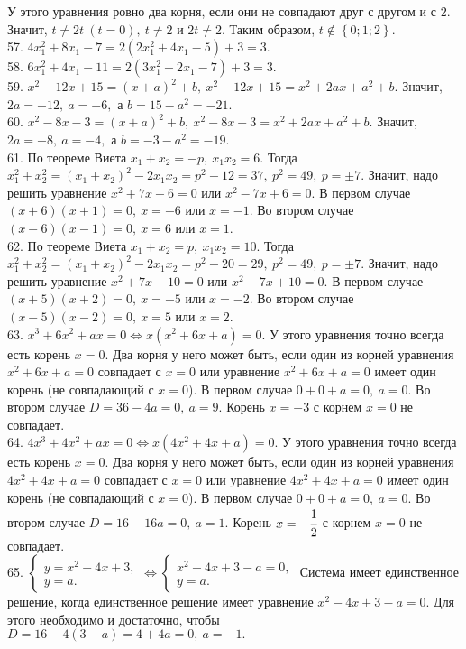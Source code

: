 У этого уравнения ровно два корня, если они не совпадают друг с другом и с $2.$ Значит, $t\neq2t\ (t=0),\ t\neq2$ и $2t\neq2.$ Таким образом, $t\notin\left\{0; 1; 2\right\}.$\\
57. $4x_1^2+8x_1-7=2(2x_1^2+4x_1-5)+3=3.$\\
58. $6x_1^2+4x_1-11=2(3x_1^2+2x_1-7)+3=3.$\\
59. $x^2-12x+15=(x+a)^2+b,\ x^2-12x+15=x^2+2ax+a^2+b.$ Значит, $2a=-12,\ a=-6,$ а $b=15-a^2=-21.$\\
60. $x^2-8x-3=(x+a)^2+b,\ x^2-8x-3=x^2+2ax+a^2+b.$ Значит, $2a=-8,\ a=-4,$ а $b=-3-a^2=-19.$\\
61. По теореме Виета $x_1+x_2=-p,\ x_1x_2=6.$ Тогда $x_1^2+x_2^2=(x_1+x_2)^2-2x_1x_2=p^2-12=37,\ p^2=49,\ p=\pm7.$ Значит, надо решить уравнение $x^2+7x+6=0$ или  $x^2-7x+6=0.$ В первом случае $(x+6)(x+1)=0,\ x=-6$ или $x=-1.$ Во втором случае $(x-6)(x-1)=0,\ x=6$ или $x=1.$\\
62. По теореме Виета $x_1+x_2=p,\ x_1x_2=10.$ Тогда $x_1^2+x_2^2=(x_1+x_2)^2-2x_1x_2=p^2-20=29,\ p^2=49,\ p=\pm7.$ Значит, надо решить уравнение $x^2+7x+10=0$ или  $x^2-7x+10=0.$ В первом случае $(x+5)(x+2)=0,\ x=-5$ или $x=-2.$ Во втором случае $(x-5)(x-2)=0,\ x=5$ или $x=2.$\\
63. $x^3+6x^2+ax=0\Leftrightarrow x(x^2+6x+a)=0.$ У этого уравнения точно всегда есть корень $x=0.$ Два корня у него может быть, если один из корней уравнения
$x^2+6x+a=0$ совпадает с $x=0$ или уравнение $x^2+6x+a=0$ имеет один корень (не совпадающий с $x=0$). В первом случае $0+0+a=0,\ a=0.$ Во втором случае $D=36-4a=0,\ a=9.$ Корень $x=-3$ с корнем $x=0$ не совпадает.\\
64. $4x^3+4x^2+ax=0\Leftrightarrow x(4x^2+4x+a)=0.$ У этого уравнения точно всегда есть корень $x=0.$ Два корня у него может быть, если один из корней уравнения
$4x^2+4x+a=0$ совпадает с $x=0$ или уравнение $4x^2+4x+a=0$ имеет один корень (не совпадающий с $x=0$). В первом случае $0+0+a=0,\ a=0.$ Во втором случае $D=16-16a=0,\ a=1.$ Корень $x=-\cfrac{1}{2}$ с корнем $x=0$ не совпадает.\\
65. $\begin{cases} y=x^2-4x+3,\\ y=a.\end{cases}\Leftrightarrow
\begin{cases} x^2-4x+3-a=0,\\ y=a.\end{cases}$ Система имеет единственное решение, когда единственное решение имеет уравнение $x^2-4x+3-a=0.$ Для этого необходимо и достаточно, чтобы $D=16-4(3-a)=4+4a=0,\ a=-1.$\\

